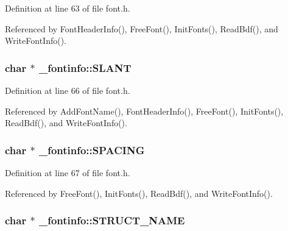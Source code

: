 Definition at line 63 of file font.\-h.



Referenced by Font\-Header\-Info(), Free\-Font(), Init\-Fonts(), Read\-Bdf(), and Write\-Font\-Info().

\hypertarget{struct__fontinfo_aff56d18df3b46ec10896d15ad3a2e164}{
\subsubsection[{S\-L\-A\-N\-T}]{\setlength{\rightskip}{0pt plus 5cm}char $\ast$ \-\_\-fontinfo\-::\-S\-L\-A\-N\-T}}\label{struct__fontinfo_aff56d18df3b46ec10896d15ad3a2e164}


Definition at line 66 of file font.\-h.



Referenced by Add\-Font\-Name(), Font\-Header\-Info(), Free\-Font(), Init\-Fonts(), Read\-Bdf(), and Write\-Font\-Info().

\hypertarget{struct__fontinfo_a0e6fafc8f03c70ce9c506d7a506fbba4}{
\subsubsection[{S\-P\-A\-C\-I\-N\-G}]{\setlength{\rightskip}{0pt plus 5cm}char $\ast$ \-\_\-fontinfo\-::\-S\-P\-A\-C\-I\-N\-G}}\label{struct__fontinfo_a0e6fafc8f03c70ce9c506d7a506fbba4}


Definition at line 67 of file font.\-h.



Referenced by Free\-Font(), Init\-Fonts(), Read\-Bdf(), and Write\-Font\-Info().

\hypertarget{struct__fontinfo_a861ecb4b5f190ccd1e71b38270240f86}{
\subsubsection[{S\-T\-R\-U\-C\-T\-\_\-\-N\-A\-M\-E}]{\setlength{\rightskip}{0pt plus 5cm}char $\ast$ \-\_\-fontinfo\-::\-S\-T\-R\-U\-C\-T\-\_\-\-N\-A\-M\-E}}\label{struct__fontinfo_a861ecb4b5f190ccd1e71b38270240f86}


